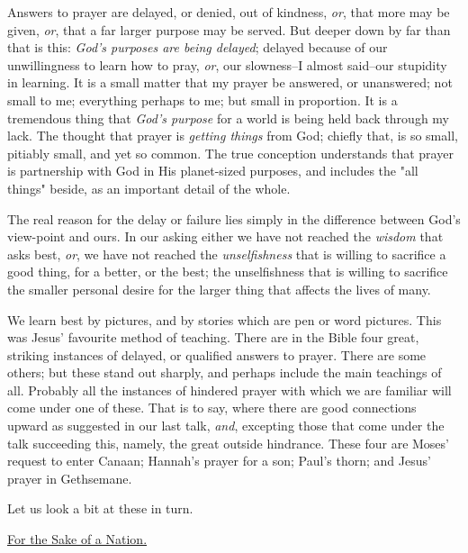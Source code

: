 Answers to prayer are delayed, or denied, out of kindness, \textit{or}, that more
may be given, \textit{or}, that a far larger purpose may be served. But deeper
down by far than that is this: \textit{God's purposes are being delayed}; delayed
because of our unwillingness to learn how to pray, \textit{or}, our slowness--I
almost said--our stupidity in learning. It is a small matter that my
prayer be answered, or unanswered; not small to me; everything perhaps to
me; but small in proportion. It is a tremendous thing that \textit{God's purpose}
for a world is being held back through my lack. The thought that prayer is
\textit{getting things} from God; chiefly that, is so small, pitiably small, and
yet so common. The true conception understands that prayer is partnership
with God in His planet-sized purposes, and includes the "all things"
beside, as an important detail of the whole.

The real reason for the delay or failure lies simply in the difference
between God's view-point and ours. In our asking either we have not
reached the \textit{wisdom} that asks best, \textit{or}, we have not reached the
\textit{unselfishness} that is willing to sacrifice a good thing, for a better,
or the best; the unselfishness that is willing to sacrifice the smaller
personal desire for the larger thing that affects the lives of many.

We learn best by pictures, and by stories which are pen or word pictures.
This was Jesus' favourite method of teaching. There are in the Bible four
great, striking instances of delayed, or qualified answers to prayer.
There are some others; but these stand out sharply, and perhaps include
the main teachings of all. Probably all the instances of hindered prayer
with which we are familiar will come under one of these. That is to say,
where there are good connections upward as suggested in our last talk,
\textit{and}, excepting those that come under the talk succeeding this, namely,
the great outside hindrance. These four are Moses' request to enter
Canaan; Hannah's prayer for a son; Paul's thorn; and Jesus' prayer in
Gethsemane.

Let us look a bit at these in turn.



\underline{For the Sake of a Nation.}


